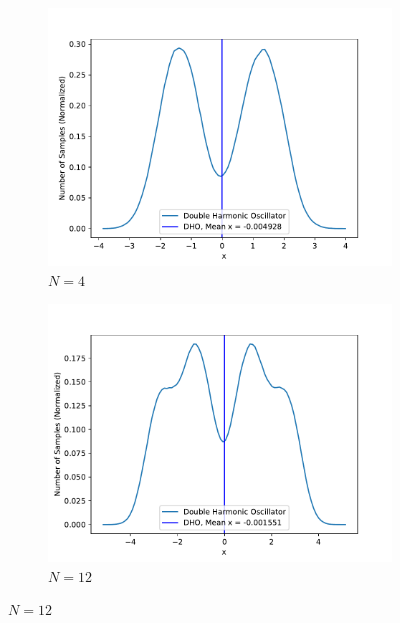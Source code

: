\documentclass[../main.tex]{subfiles}
\begin{document}
\begin{figure}[!ht]
\medskip
\begin{subfigure}{0.48\textwidth}
\includegraphics[width=\linewidth]{figures/densityDHO/density_DHO_N4_Omega1_2d_x}
\caption{$N=4$} \label{fig:DHO_N4_2d_x_c}
\end{subfigure}\hspace*{\fill}
\begin{subfigure}{0.48\textwidth}
\includegraphics[width=\linewidth]{figures/densityDHO/density_DHO_N12_Omega1_2d_x}
\caption{$N=12$} \label{fig:DHO_N12_2d_x_d}
\end{subfigure}


\end{figure}
\end{document}
